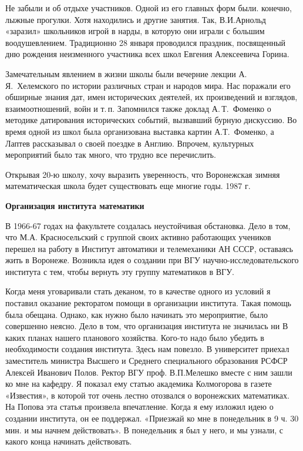Не забыли и об отдыхе участников. Одной из его главных форм были. конечно, лыжные прогулки. Хотя находились и другие занятия. Так, В.И.Арнольд «заразил» школьников игрой в нарды, в которую они играли с большим воодушевлением. Традиционно 28 января проводился праздник, посвященный дню рождения неизменного участника всех школ Евгения Алексеевича Горина.

Замечательным явлением в жизни школы были вечерние лекции А.\,Я.~Хелемского по истории различных стран и народов мира.
Нас поражали его обширные знания дат, имен исторических деятелей, их произведений и взглядов,
взаимоотношений, войн и т.\,п.
Запомнился также доклад А.\,Т.~Фоменко о методике датирования исторических событий, вызвавший бурную дискуссию.
Во время одной из школ была организована выставка картин А.Т.~Фоменко,
а Лаптев рассказывал о своей поездке в Англию. Впрочем, культурных мероприятий было так много, что трудно все перечислить.

Открывая 20-ю школу, хочу выразить уверенность, что Воронежская зимняя математическая школа будет существовать еще многие годы.
1987 г.

{\bf Организация института математики}

В 1966-67 годах на факультете создалась неустойчивая обстановка. Дело в том, что М.А. Красносельский с группой своих активно работающих учеников перешел на работу в Институт автоматики и телемеханики АН СССР, оставаясь жить в Воронеже. Возникла идея о создании при ВГУ научно-исследовательского института с тем, чтобы вернуть эту группу математиков в ВГУ.

Когда меня уговаривали стать деканом, то в качестве одного из условий я
поставил оказание ректоратом помощи в организации института. Такая помощь была обещана. Однако, как нужно было начинать это мероприятие, было совершенно неясно. Дело в том, что организация института не значилась ни В каких планах нашего планового хозяйства. Кого-то надо было убедить в необходимости создания института. Здесь нам повезло. В университет приехал заместитель министра Высшего и Среднего специального образования РСФСР Алексей Иванович Полов. Ректор ВГУ проф. В.П.Мелешко вместе с ним зашли ко мне на кафедру. Я показал ему статью академика Колмогорова в газете «Известия», в которой тот очень лестно отозвался о воронежских математиках. На Попова эта статья произвела впечатление. Когда я ему изложил идею о создании института, он ее поддержал. «Приезжай ко мне в понедельник в 9 ч. 30 мин. и мы начнем действовать». В понедельник я был у него, и мы узнали, с какого конца начинать действовать.

